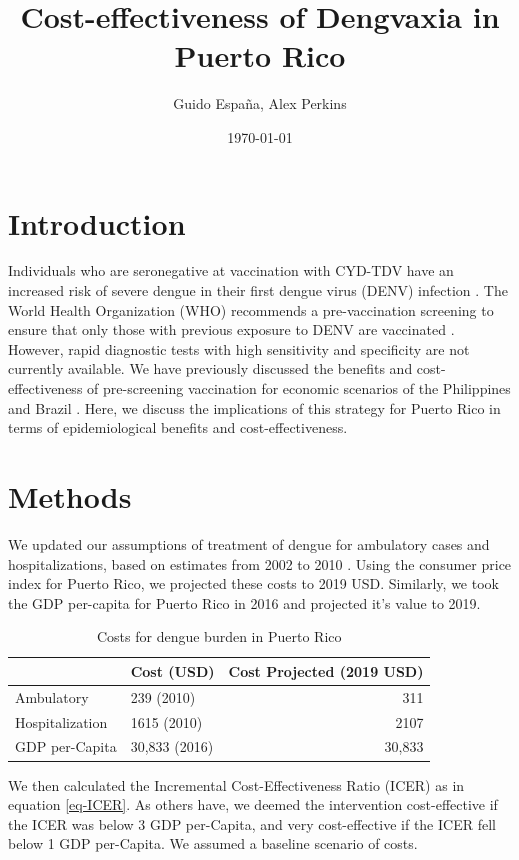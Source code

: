 \documentclass[12pt]{article}
\author{Guido España, Alex Perkins}
\date{\today}
\title{Cost-effectiveness of Dengvaxia in Puerto Rico}
\begin{document}
\maketitle

\section{Introduction}
Individuals who are seronegative at vaccination with CYD-TDV have an increased risk of severe dengue in their first dengue virus (DENV) infection \cite{Sridhar2018}. The World Health Organization (WHO) recommends a pre-vaccination screening to ensure that only those with previous exposure to DENV are vaccinated \cite{WHO2018}. However, rapid diagnostic tests with high sensitivity and specificity are not currently available. We have previously discussed the benefits and cost-effectiveness of pre-screening vaccination for economic scenarios of the Philippines and Brazil \cite{Espana2019Biorxiv}. Here, we discuss the implications of this strategy for Puerto Rico in terms of epidemiological benefits and cost-effectiveness.


\section{Methods}
We updated our assumptions of treatment of dengue for ambulatory cases and hospitalizations, based on estimates from 2002 to 2010 \cite{Halasa2012}. Using the consumer price index for Puerto Rico, we projected these costs to 2019 USD. Similarly, we took the GDP per-capita for Puerto Rico in 2016 \cite{worldbank2016} and projected it's value to 2019. 

\begin{table}
  \begin{center}
    \begin{tabular}{|l|l|r|}
      \hline
      & Cost (USD) & Cost Projected (2019 USD)\\
      \hline
      Ambulatory & 239 (2010) & 311\\
      Hospitalization & 1615 (2010) & 2107\\
      GDP per-Capita & 30,833 (2016) & 30,833\\
      \hline
    \end{tabular}
  \end{center}
  \caption{Costs for dengue burden in Puerto Rico}
  \label{tbl-costs}
\end{table}

We then calculated the Incremental Cost-Effectiveness Ratio (ICER) as in equation \ref{eq-ICER}. As others have, we deemed the intervention cost-effective if the ICER was below 3 GDP per-Capita, and very cost-effective if the ICER fell below 1 GDP per-Capita. We assumed a baseline scenario of costs.
\end{document}
